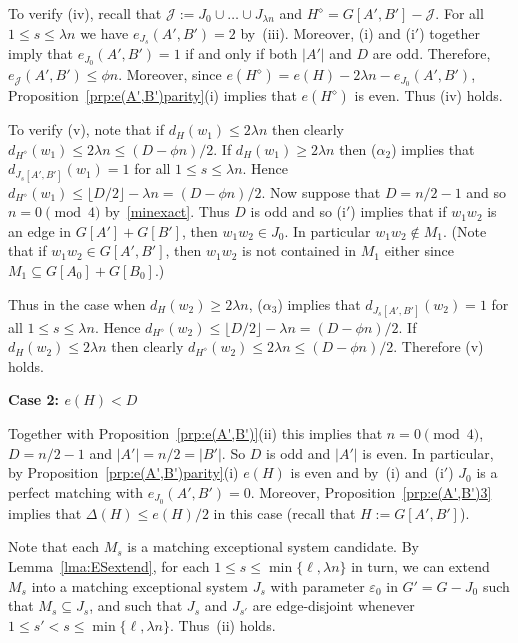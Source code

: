 \documentclass{memo-l}
\def\COMMENT#1{}
\def\eps{\varepsilon}
\numberwithin{section}{chapter}
\numberwithin{equation}{section}
\numberwithin{firstthm}{section}
\numberwithin{figure}{section}
\begin{document}
To verify (iv), recall that $\mathcal{J}:=J_0\cup\dots \cup J_{\lambda n}$ and $H^{\diamond}= G[A', B'] - \mathcal{J}$.
For all $1 \le s \le \lambda n$ we have $e_{J_s}(A',B') = 2$ by~(iii).
Moreover, (i) and (i$'$) together imply that $e_{J_0}(A',B') = 1$ if and only if both $|A'|$ and $D$ are odd.
Therefore, $e_{\mathcal{J}}(A',B') \le \phi n $. Moreover, since $e(H^{\diamond})=e(H)-2\lambda n-e_{J_0}(A',B')$,
Proposition~\ref{prp:e(A',B')parity}(i) implies that $e(H^{\diamond})$ is even. Thus (iv) holds.

To verify (v), note that if $d_H(w_1) \le  2 \lambda n $ then clearly $d_{H^{\diamond}}(w_1)\le 2 \lambda n\le (D- \phi n )/2$.
If $d_H(w_1) \ge  2 \lambda n $ then ($\alpha_2$) implies that $d_{J_s[A',B']}(w_1) = 1$ for all $1 \le s \le \lambda n$.
Hence $d_{H^{\diamond}}(w_1) \le \lfloor D/2 \rfloor - \lambda n = (D- \phi n )/2$.
Now suppose that $D = n/2 - 1$ and so $n = 0 \pmod4$ by~\eqref{minexact}. Thus $D$ is odd and so (i$'$) implies that
if $w_1w_2$ is an edge in $G[A']+G[B']$, then $w_1w_2 \in J_0$. In particular $w_1w_2\notin M_1$.
(Note that if $w_1w_2 \in G[A',B']$, then $w_1w_2$ is not contained in $M_1$ either since $M_1\subseteq G[A_0]+G[B_0]$.)%
    \COMMENT{Daniela: slightly changed the previous sentence}
Thus in the case when $d_H(w_2) \ge 2 \lambda n$, ($\alpha_3$) implies that $d_{J_s[A',B']}(w_2) = 1$ for all $1 \le s \le \lambda n$.
Hence $d_{H^{\diamond}}(w_2) \le \lfloor D/2 \rfloor - \lambda n = (D- \phi n )/2$.
If $d_H(w_2) \le  2 \lambda n $ then clearly $d_{H^{\diamond}}(w_2)\le 2 \lambda n\le (D- \phi n )/2$.
Therefore (v) holds. 

\medskip

\noindent \textbf{Case 2: $e(H)<D$}

\smallskip

\noindent Together with Proposition~\ref{prp:e(A',B')}(ii) this implies that $n = 0 \pmod4$, $D = n/2-1$ and $|A'| = n/2 = |B'|$.
So $D$ is odd and $|A'|$ is even.
In particular, by Proposition~\ref{prp:e(A',B')parity}(i) $e(H)$ is even and by~(i) and~(i$'$) $J_0$ is a perfect matching with $e_{J_0}(A',B') =0$.
Moreover, Proposition~\ref{prp:e(A',B')3} implies that $\Delta(H) \le e(H) /2$ in this case
(recall that $H:=G[A',B']$).%
\COMMENT{Deryk: this bracket and the next sentence are new.}

Note that each $M_s$ is a matching exceptional system candidate.
By Lemma~\ref{lma:ESextend}, for each $1 \le s \le \min \{\ell, \lambda n \}$ in turn, we can extend $M_s$ into a matching exceptional system $J_s$
with parameter $\eps_0$ in $G'=G-J_0$ such that $M_s \subseteq J_s$, 
and such that $J_s$ and $J_{s'}$ are edge-disjoint whenever $1\le s' < s\le \min \{\ell, \lambda n \}$. Thus~(ii) holds.
\end{document}
